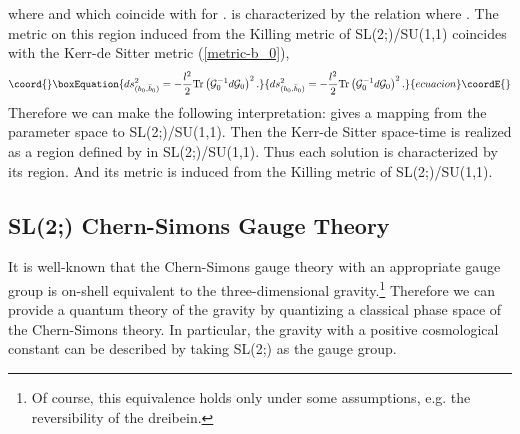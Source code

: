 \documentclass[a4paper,11pt]{article}
\begin{document}
where \coordHE{} and 
\coordHE{} which coincide with 
\myHighlight{$\sqrt{\mu}$}\coordHE{} for \coordHE{}.
\coordHE{} is characterized by the relation 
\coordHE{} 
where \coordHE{}.
The metric on this region induced from the Killing metric of 
SL(2;\coordHE{})/SU(1,1) coincides with the Kerr-de Sitter metric 
(\ref{metric-b_0}),
\begin{equation}\coord{}\boxEquation{
ds^2_{(b_0, \bar{b}_0)}=
  -\frac{l^2}{2}\mbox{Tr}\left({\cal G}_0^{-1}d{\cal G}_0\right)^2.
}{
ds^2_{(b_0, \bar{b}_0)}=
  -\frac{l^2}{2}\mbox{Tr}\left({\cal G}_0^{-1}d{\cal G}_0\right)^2.
}{ecuacion}\coordE{}\end{equation}
Therefore we can make the following interpretation: 
\coordHE{} gives a mapping from the parameter space 
\coordHE{} to SL(2;\coordHE{})/SU(1,1).
Then the Kerr-de Sitter space-time is realized as a region 
defined by \coordHE{} in SL(2;\coordHE{})/SU(1,1). 
Thus each solution is characterized by its region.
And its metric is induced from the Killing metric of 
SL(2;\coordHE{})/SU(1,1).


\subsection{SL(2;\coordHE{}) Chern-Simons Gauge Theory}
It is well-known that the Chern-Simons gauge theory with an appropriate 
gauge group is on-shell equivalent to the three-dimensional
gravity\cite{Townsend, Witten2}.\footnote{
Of course, this equivalence holds only under some assumptions, 
e.g. the reversibility of the dreibein.
} 
Therefore we can provide a quantum theory of the gravity by quantizing 
a classical phase space of the Chern-Simons theory.
In particular, the gravity with a positive cosmological constant 
can be described by taking SL(2;\coordHE{}) as the gauge group.
\end{document}
